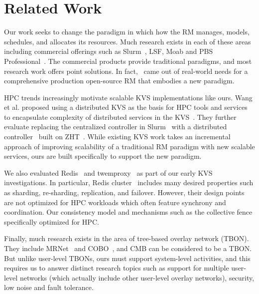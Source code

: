 \section{Related Work}
Our work seeks to change the paradigm in which 
how the RM manages, models, schedules, and
allocates its resources. Much research exists in
each of these areas including commercial offerings
such as Slurm~\cite{Jette02slurm}, LSF,
Moab and PBS Professional~\cite{PSBPro}.
The commercial products provide traditional paradigms, and
most research work offers 
point solutions. In fact, \flux\ came out of real-world needs 
for a comprehensive production open-source RM that embodies a new paradigm. 

HPC trends increasingly motivate scalable KVS implementations 
like ours. Wang et al. proposed using a distributed KVS 
as the basis for HPC tools and services to encapsulate
complexity of distributed services in the KVS~\cite{Wang:2013:USE:2503210.2503239}.
%
They further evaluate replacing the centralized controller in
Slurm~\cite{Jette02slurm} with a distributed controller~\cite{Slurmpp}
built on ZHT~\cite{Li:2013:ZLR:2510661.2511401}.
While existing KVS work takes an incremental approach of improving 
scalability of a traditional RM paradigm with new scalable services,
ours are built specifically to support the new paradigm. 

We also evaluated Redis~\cite{Redis} and twemproxy~\cite{Twemproxy}
as part of our early KVS investigations.
In particular, Redis cluster~\cite{RedisClusterTut,RedisClusterSpec} 
includes many desired properties such as 
sharding, re-sharding, replication, and failover.
However, their design points are not optimized
for HPC workloads which often feature synchrony and coordination. 
Our consistency model and mechanisms such as the collective fence 
specifically optimized for HPC.


%
Finally, much research exists in the area of tree-based overlay network (TBON). 
They include MRNet~\cite{mrnet} and COBO~\cite{launchmon}, and 
CMB can be considered to be a TBON. But unlike user-level
TBONs, ours must support system-level activities, and this 
requires us to answer distinct research topics
such as support for multiple user-level networks (which actually
include other user-level overlay networks), security, low noise 
and fault tolerance. 

